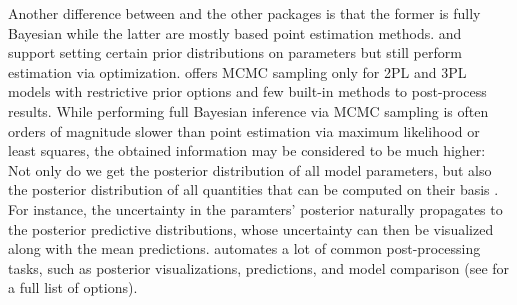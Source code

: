 \documentclass[jss]{jss}
\begin{document}
Another difference between  and the other packages is that the
former is fully Bayesian while the latter are mostly based point
estimation methods.  and  support setting certain
prior distributions on parameters but still perform estimation via
optimization.  offers MCMC sampling only for 2PL and 3PL
models with restrictive prior options and few built-in methods to
post-process results. While performing full Bayesian inference via MCMC
sampling is often orders of magnitude slower than point estimation via
maximum likelihood or least squares, the obtained information may be
considered to be much higher: Not only do we get the posterior
distribution of all model parameters, but also the posterior
distribution of all quantities that can be computed on their basis
\citep{gelman2014}. For instance, the uncertainty in the paramters'
posterior naturally propagates to the posterior predictive
distributions, whose uncertainty can then be visualized along with the
mean predictions.  automates a lot of common post-processing
tasks, such as posterior visualizations, predictions, and model
comparison (see  for a full list of
options).
\end{document}
